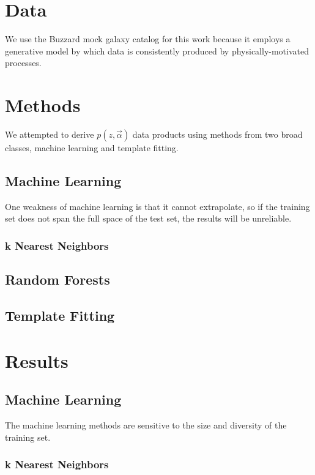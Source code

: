 \documentclass[12pt, preprint]{aastex}
\begin{document}
\section{Data}

We use the Buzzard mock galaxy catalog for this work because it employs a generative model by which data is consistently produced by physically-motivated processes.

\section{Methods}

We attempted to derive $p(z,\vec{\alpha})$ data products using methods from two broad classes, machine learning and template fitting.

\subsection{Machine Learning}

One weakness of machine learning is that it cannot extrapolate, so if the training set does not span the full space of the test set, the results will be unreliable.

\subsubsection{k Nearest Neighbors}

\subsection{Random Forests}

\subsection{Template Fitting}

\section{Results}

\subsection{Machine Learning}

The machine learning methods are sensitive to the size and diversity of the training set.

\subsubsection{k Nearest Neighbors}
\end{document}
